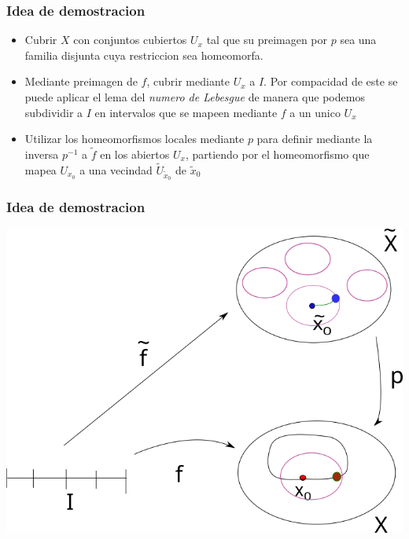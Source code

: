 \documentclass[xetex,mathserif,serif]{beamer}
\begin{document}
  \begin{frame}
    \frametitle{Idea de demostracion}
    \begin{itemize}
    \item Cubrir \(X\) con conjuntos cubiertos \(U_x\) tal que su
      preimagen por \(p\) sea una familia disjunta cuya restriccion sea
      homeomorfa.
    \item Mediante preimagen de \(f\), cubrir mediante \(U_x\) a \(I\).
      Por compacidad de este se puede aplicar el lema del \emph{numero
        de Lebesgue} de manera que podemos subdividir a \(I\) en
      intervalos que se mapeen mediante \(f\) a un unico \(U_x\)
    \item Utilizar los homeomorfismos locales mediante \(p\) para
      definir mediante la inversa \(p^{-1}\) a \(\tilde f\) en los
      abiertos \(U_x\), partiendo por el homeomorfismo que mapea
      \(U_{x_0}\) a una vecindad \(\tilde U _{\tilde x_0}\) de \(\tilde
      x_0\)
    \end{itemize}
  \end{frame}

  \begin{frame}
    \frametitle{Idea de demostracion}
    \begin{center}
        \includegraphics[scale=0.4]{./imag/levantamientos1.png}
    \end{center}
  \end{frame}
\end{document}
